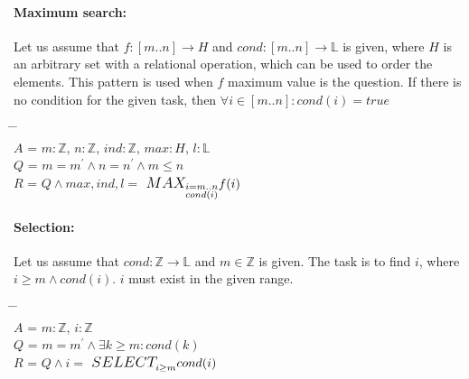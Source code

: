 \documentclass[12pt]{article}
\newcommand{\makesym}[4]{ $\mathlarger{\mathlarger{#1}}_{#2}^{#3} #4 $}
\begin{document}
    \paragraph{Maximum search:} Let us assume that $f : [m..n] \to H$ and $cond : [m..n] \to \mathbb{L}$ is given, where $H$ is an arbitrary set with a relational operation, which can be used to order the elements. This pattern is used when $f$ maximum value is the question. If there is no condition for the given task, then $\forall i \in [m..n] : cond(i) = true$
    \begin{tabbing}
    \hspace*{0.5cm} \= \hspace*{0.5cm}  \= \hspace*{1.5cm}  \= \\
    $A$ \> = \> $m:\mathbb{Z}$, $n:\mathbb{Z}$, $ind:\mathbb{Z}$, $max:H$, $l:\mathbb{L}$ \\ 
    $Q$ \> = \> $m=m^{'} \land n=n^{'} \land m \leq n$ \\
    $R$ \> = \> $Q \land max, ind, l = $ \makesym{MAX}{\substack{i=m..n \\ cond(i)}}{}{f(i)} 
    \end{tabbing}
    
    \paragraph{Selection:} Let us assume that $cond : \mathbb{Z} \to \mathbb{L}$ and $m \in \mathbb{Z}$ is given. The task is to find $i$, where $i \geq m \land cond(i)$. $i$ must exist in the given range.
    \begin{tabbing}
    \hspace*{0.5cm} \= \hspace*{0.5cm}  \= \hspace*{1.5cm}  \= \\
    $A$ \> = \> $m:\mathbb{Z}$, $i:\mathbb{Z}$ \\ 
    $Q$ \> = \> $m=m^{'} \land \exists k \geq m : cond(k)$ \\
    $R$ \> = \> $Q \land i = $ \makesym{SELECT}{\substack{i \geq m }}{}{cond(i)} 
    \end{tabbing}
    
\end{document}
